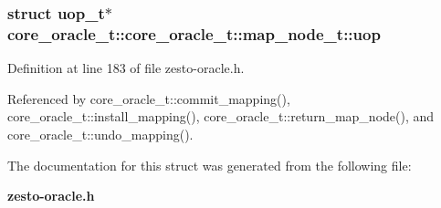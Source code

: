 \subsubsection[{uop}]{\setlength{\rightskip}{0pt plus 5cm}struct {\bf uop\_\-t}$\ast$ core\_\-oracle\_\-t::core\_\-oracle\_\-t::map\_\-node\_\-t::uop\hspace{0.3cm}{\tt  [read]}}\label{structcore__oracle__t_1_1map__node__t_2186c80a8356e79436815b51fb01b978}




Definition at line 183 of file zesto-oracle.h.

Referenced by core\_\-oracle\_\-t::commit\_\-mapping(), core\_\-oracle\_\-t::install\_\-mapping(), core\_\-oracle\_\-t::return\_\-map\_\-node(), and core\_\-oracle\_\-t::undo\_\-mapping().

The documentation for this struct was generated from the following file:\begin{CompactItemize}
\item 
{\bf zesto-oracle.h}\end{CompactItemize}
